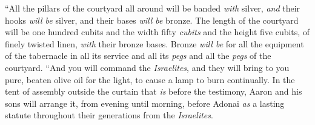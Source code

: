 \begin{biblechapter}
\verse “All the pillars of the courtyard all around will be banded \textit{with} silver, \textit{and} their hooks \textit{will be} silver, and their bases \textit{will be} bronze.
\verse The length of the courtyard will be one hundred cubits and the width fifty \textit{cubits} and the height five cubits, of finely twisted linen, \textit{with} their bronze bases.
\verse Bronze \textit{will be} for all the equipment of the tabernacle in all its service and all its \textit{pegs} and all the \textit{pegs} of the courtyard.
 “And you will command the \textit{Israelites}, and they will bring to you pure, beaten olive oil for the light, to cause a lamp to burn continually.
\verse In the tent of assembly outside the curtain that \textit{is} before the testimony, Aaron and his sons will arrange it, from evening until morning, before Adonai \textit{as} a lasting statute throughout their generations from the \textit{Israelites}.
\end{biblechapter}

